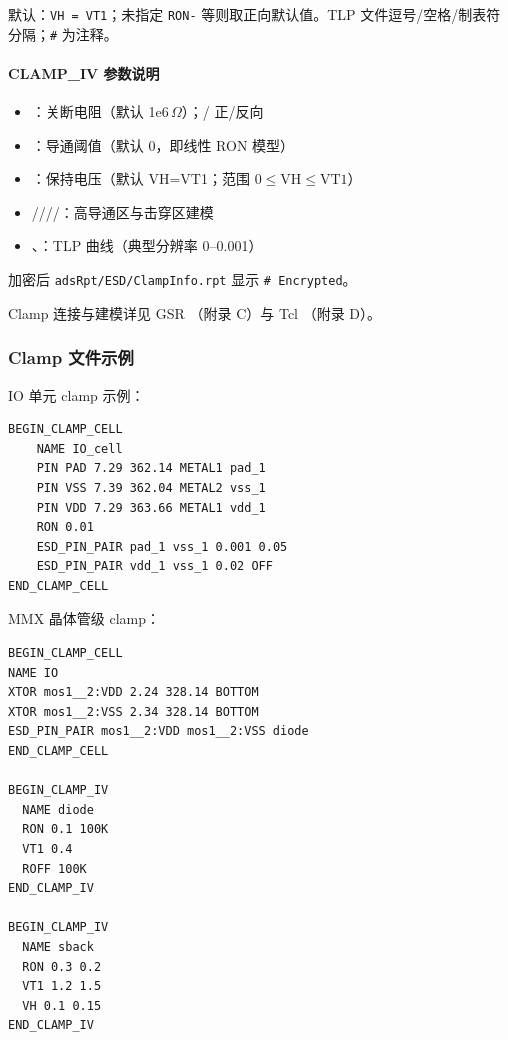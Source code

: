 默认：\texttt{VH = VT1}；未指定 \texttt{RON-} 等则取正向默认值。TLP 文件逗号/空格/制表符分隔；\texttt{\#} 为注释。

\paragraph{CLAMP\_IV 参数说明}
\begin{itemize}
  \item {}：关断电阻（默认 1e6\,$\Omega$）；/ 正/反向
  \item {}：导通阈值（默认 0，即线性 RON 模型）
  \item {}：保持电压（默认 VH=VT1；范围 $0 \le \mathrm{VH} \le \mathrm{VT1}$）
  \item {}////：高导通区与击穿区建模
  \item {}、：TLP 曲线（典型分辨率 0--0.001）
\end{itemize}

加密后 \texttt{adsRpt/ESD/ClampInfo.rpt} 显示 \texttt{\# Encrypted}。

\begin{seeAlsoBox}
Clamp 连接与建模详见 GSR （附录 C）与 Tcl （附录 D）。
\end{seeAlsoBox}

\subsubsection{Clamp 文件示例}
IO 单元 clamp 示例：
\begin{lstlisting}
BEGIN_CLAMP_CELL
    NAME IO_cell
    PIN PAD 7.29 362.14 METAL1 pad_1
    PIN VSS 7.39 362.04 METAL2 vss_1
    PIN VDD 7.29 363.66 METAL1 vdd_1
    RON 0.01
    ESD_PIN_PAIR pad_1 vss_1 0.001 0.05
    ESD_PIN_PAIR vdd_1 vss_1 0.02 OFF
END_CLAMP_CELL
\end{lstlisting}

MMX 晶体管级 clamp：
\begin{lstlisting}
BEGIN_CLAMP_CELL
NAME IO
XTOR mos1__2:VDD 2.24 328.14 BOTTOM
XTOR mos1__2:VSS 2.34 328.14 BOTTOM
ESD_PIN_PAIR mos1__2:VDD mos1__2:VSS diode
END_CLAMP_CELL

BEGIN_CLAMP_IV
  NAME diode
  RON 0.1 100K
  VT1 0.4
  ROFF 100K
END_CLAMP_IV

BEGIN_CLAMP_IV
  NAME sback
  RON 0.3 0.2
  VT1 1.2 1.5
  VH 0.1 0.15
END_CLAMP_IV
\end{lstlisting}

